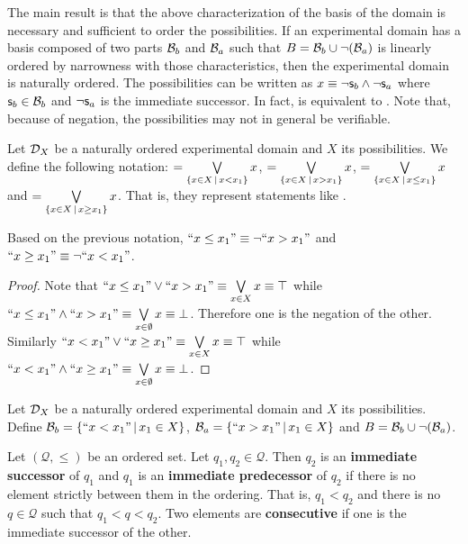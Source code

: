 \documentclass[11pt,letterpaper,fleqn]{memoir} %
\begin{document}
The main result is that the above characterization of the basis of the domain is necessary and sufficient to order the possibilities. If an experimental domain has a basis composed of two parts $\mathcal{B}_b$ and $\mathcal{B}_a$ such that $B=\mathcal{B}_b \cup \neg(\mathcal{B}_a)$ is linearly ordered by narrowness with those characteristics, then the experimental domain is naturally ordered. The possibilities can be written as $x \equiv \neg \mathsf{s}_b \wedge \neg \mathsf{s}_a$ where $\mathsf{s}_b \in \mathcal{B}_b$ and $\neg \mathsf{s}_a$ is the immediate successor. In fact,  is equivalent to . Note that, because of negation, the possibilities may not in general be verifiable.

\begin{mathSection}
\begin{defn}
	Let $\mathcal{D}_X$ be a naturally ordered experimental domain and $X$ its possibilities. We define the following notation:
	$=\bigvee\limits_{\{x \in X \, | \, x < x_1\}} x$, $=\bigvee\limits_{\{x \in X \, | \, x > x_1\}} x$, $=\bigvee\limits_{\{x \in X \, | \, x \leq x_1\}} x$ and $=\bigvee\limits_{\{x \in X \, | \, x \geq x_1\}} x$. That is, they represent statements like .
\end{defn}
\begin{coro}\label{3_coro_not_after_is_before_or_on}
	Based on the previous notation, $``x \leq x_1"\equiv \neg ``x > x_1"$ and $``x \geq x_1"\equiv \neg ``x < x_1"$.
\end{coro}
\begin{proof}
	Note that $``x \leq x_1" \vee ``x > x_1" \equiv \bigvee\limits_{x \in X} x \equiv \top$ while $``x \leq x_1" \wedge ``x > x_1" \equiv \bigvee\limits_{x \in \emptyset} x \equiv \bot$. Therefore one is the negation of the other. Similarly $``x < x_1" \vee ``x \geq x_1" \equiv \bigvee\limits_{x \in X} x \equiv \top$ while $``x < x_1" \wedge ``x \geq x_1" \equiv \bigvee\limits_{x \in \emptyset} x \equiv \bot$.
\end{proof}
\begin{defn}\label{3_def_before_after_basis}
	Let $\mathcal{D}_X$ be a naturally ordered experimental domain and $X$ its possibilities. Define $\mathcal{B}_b = \{ ``x < x_1" \, | \, x_1 \in X \}$, $\mathcal{B}_a = \{ ``x > x_1" \, | \, x_1 \in X \}$ and $B = \mathcal{B}_b \cup \neg (\mathcal{B}_a)$.
\end{defn}
\begin{defn}
	Let $(\mathcal{Q}, \leq)$ be an ordered set. Let $q_1, q_2 \in \mathcal{Q}$. Then $q_2$ is an \textbf{immediate successor} of $q_1$ and $q_1$ is an \textbf{immediate predecessor} of $q_2$ if there is no element strictly between them in the ordering. That is, $q_1 < q_2$ and there is no $q \in \mathcal{Q}$ such that $q_1 < q < q_2$. Two elements are \textbf{consecutive} if one is the immediate successor of the other.
\end{defn}


\end{mathSection}
\end{document}
